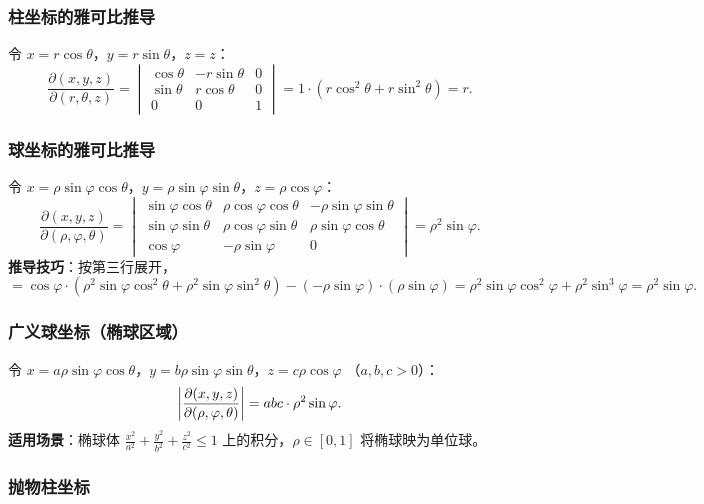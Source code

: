 \documentclass{ctexart}
\begin{document}
\subsubsection*{柱坐标的雅可比推导}

令 $x = r\cos\theta$，$y = r\sin\theta$，$z = z$：
\[
  \frac{\partial(x,y,z)}{\partial(r,\theta,z)}
  = \begin{vmatrix}
      \cos\theta & -r\sin\theta & 0 \\
      \sin\theta & r\cos\theta & 0 \\
      0 & 0 & 1
    \end{vmatrix}
  = 1 \cdot (r\cos^2\theta + r\sin^2\theta) = r.
\]

\subsubsection*{球坐标的雅可比推导}

令 $x = \rho\sin\varphi\cos\theta$，$y = \rho\sin\varphi\sin\theta$，$z = \rho\cos\varphi$：
\[
  \frac{\partial(x,y,z)}{\partial(\rho,\varphi,\theta)}
  = \begin{vmatrix}
      \sin\varphi\cos\theta & \rho\cos\varphi\cos\theta & -\rho\sin\varphi\sin\theta \\
      \sin\varphi\sin\theta & \rho\cos\varphi\sin\theta & \rho\sin\varphi\cos\theta \\
      \cos\varphi & -\rho\sin\varphi & 0
    \end{vmatrix}
  = \rho^2 \sin\varphi.
\]
\textbf{推导技巧}：按第三行展开，
\[
  = \cos\varphi \cdot (\rho^2\sin\varphi\cos^2\theta + \rho^2\sin\varphi\sin^2\theta)
    - (-\rho\sin\varphi) \cdot (\rho\sin\varphi)
  = \rho^2\sin\varphi\cos^2\varphi + \rho^2\sin^3\varphi
  = \rho^2\sin\varphi.
\]

\subsubsection*{广义球坐标（椭球区域）}

令 $x = a\rho\sin\varphi\cos\theta$，$y = b\rho\sin\varphi\sin\theta$，$z = c\rho\cos\varphi$
（$a,b,c > 0$）：
\[
  \left| \frac{\partial(x,y,z)}{\partial(\rho,\varphi,\theta)} \right| = abc \cdot \rho^2\sin\varphi.
\]
\textbf{适用场景}：椭球体 $\frac{x^2}{a^2}+\frac{y^2}{b^2}+\frac{z^2}{c^2} \le 1$
上的积分，$\rho \in [0,1]$ 将椭球映为单位球。

\subsubsection*{抛物柱坐标}
\end{document}
